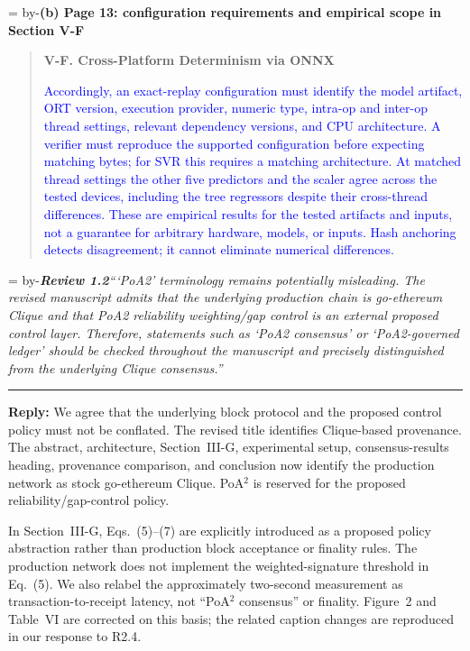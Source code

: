 \documentclass[11pt]{article}
\newenvironment{excerpt}{\begin{quote}\small\sloppy}{\end{quote}}
\newcommand{\roomfor}[1]{\par\begingroup\dimen0=\pagegoal\advance\dimen0 by-\pagetotal\ifdim\dimen0<#1\baselineskip\newpage\fi\endgroup}
\newcommand{\review}[2]{\roomfor{10}\bigskip\noindent\textbf{\textit{Review #1}}\quad\textit{``#2''}\par\smallskip\hrule\medskip}
\newcommand{\reply}{\noindent\textbf{Reply:} }
\newcommand{\loc}[1]{\roomfor{7}\medskip\noindent\textbf{#1}\par\smallskip}
\newcommand{\mshead}[2]{\par\noindent\textbf{#1. #2}\par\smallskip}
\begin{document}
\loc{(b) Page 13: configuration requirements and empirical scope in Section V-F}
\begin{excerpt}
\mshead{V-F}{Cross-Platform Determinism via ONNX}

\textcolor{blue}{Accordingly, an exact-replay configuration must identify
the model artifact, ORT version, execution provider, numeric type,
intra-op and inter-op thread settings, relevant dependency versions,
and CPU architecture. A verifier must reproduce the supported
configuration before expecting matching bytes; for SVR this requires
a matching architecture. At matched thread settings the other five
predictors and the scaler agree across the tested devices, including
the tree regressors despite their cross-thread differences. These
are empirical results for the tested artifacts and inputs, not a
guarantee for arbitrary hardware, models, or inputs. Hash anchoring
detects disagreement; it cannot eliminate numerical differences.}
\end{excerpt}

\review{1.2}{`PoA2' terminology remains potentially misleading. The revised manuscript admits that the underlying production chain is go-ethereum Clique and that PoA2 reliability weighting/gap control is an external proposed control layer. Therefore, statements such as `PoA2 consensus' or `PoA2-governed ledger' should be checked throughout the manuscript and precisely distinguished from the underlying Clique consensus.}

\reply We agree that the underlying block protocol and the
proposed control policy must not be conflated. The revised title identifies
Clique-based provenance. The abstract, architecture, Section~III-G,
experimental setup, consensus-results heading, provenance comparison, and
conclusion now identify the production network as stock go-ethereum Clique.
PoA$^2$ is reserved for the proposed reliability/gap-control policy.

In Section~III-G, Eqs.~(5)--(7) are explicitly introduced as a proposed policy
abstraction rather than production block acceptance or finality rules. The
production network does not implement the weighted-signature threshold in
Eq.~(5). We also relabel the approximately two-second measurement as
transaction-to-receipt latency, not ``PoA$^2$ consensus'' or finality.
Figure~2 and Table~VI are corrected on this basis; the related caption
changes are reproduced in our response to R2.4.
\end{document}
